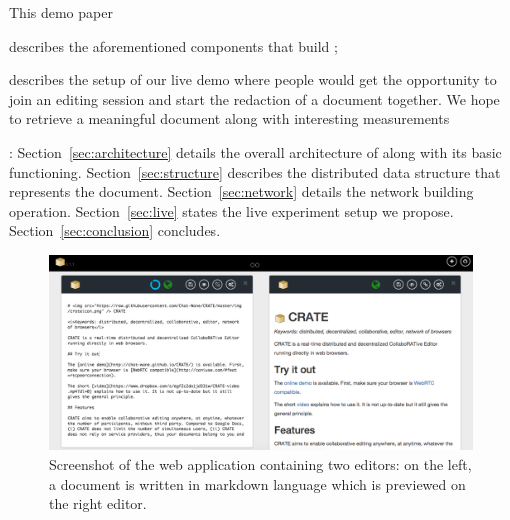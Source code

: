 
This demo paper
\begin{inparaenum}[(i)]
\item describes the aforementioned components that build \CRATE;
\item describes the setup of our live demo where people would get the
  opportunity to join an editing session and start the redaction of a document
  together. We hope to retrieve a meaningful document along with interesting
  measurements 
\end{inparaenum}

:
Section~\ref{sec:architecture} details the overall architecture of \CRATE along
with its basic functioning. Section~\ref{sec:structure} describes the
distributed data structure that represents the
document. Section~\ref{sec:network} details the network building
operation. Section~\ref{sec:live} states the live experiment setup we
propose. Section~\ref{sec:conclusion} concludes.

\begin{figure}
  \includegraphics[width=\textwidth]{./img/screenshot.png}
  \caption{\label{img:screenshot} Screenshot of the web application containing
    two editors: on the left, a document is written in markdown language which
    is previewed on the right editor.}
\end{figure}

